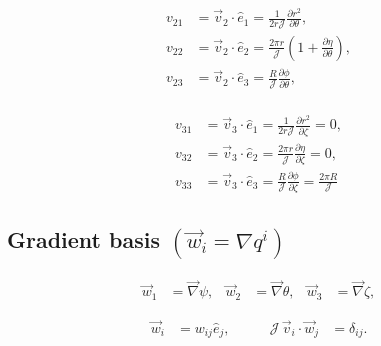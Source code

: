 \documentclass[10pt,a4paper]{article}
\numberwithin{equation}{section}
\begin{document}
\begin{equation}
\begin{aligned}
v_{21} &= \vec{v}_2 \cdot \hat{e}_1 = \frac{1}{2r\mathcal{J}}\frac{\partial r^2}{\partial \theta}, \\[6pt]
v_{22} &= \vec{v}_2 \cdot \hat{e}_2 = \frac{2\pi r}{\mathcal{J}}\left(1+\frac{\partial \eta}{\partial \theta}\right), \\[6pt]
v_{23} &= \vec{v}_2 \cdot \hat{e}_3 = \frac{R}{\mathcal{J}}\frac{\partial \phi}{\partial \theta}, \\[6pt]
\end{aligned}
\end{equation}

\begin{equation}
\begin{aligned}
v_{31} &= \vec{v}_3 \cdot \hat{e}_1 = \frac{1}{2r\mathcal{J}}\frac{\partial r^2}{\partial \zeta} = 0, \\[6pt]
v_{32} &= \vec{v}_3 \cdot \hat{e}_2 = \frac{2\pi r}{\mathcal{J}}\frac{\partial \eta}{\partial \zeta} = 0, \\[6pt]
v_{33} &= \vec{v}_3 \cdot \hat{e}_3 = \frac{R}{\mathcal{J}}\frac{\partial \phi}{\partial \zeta} = \frac{2\pi R}{\mathcal{J}}
\end{aligned}
\end{equation}


\subsection{Gradient basis $(\vec w_i=\nabla q^i)$}
\begin{equation}
\begin{aligned}
\vec{w}_1 &= \vec{\nabla}\psi, &
\vec{w}_2 &= \vec{\nabla}\theta, &
\vec{w}_3 &= \vec{\nabla}\zeta, 
\end{aligned}
\end{equation}

\begin{equation}
    \begin{aligned}
    \vec{w}_i &= w_{ij}\hat{e}_j, \qquad &
    \mathcal{J}\,\vec{v}_i \cdot \vec{w}_j &= \delta_{ij}.
    \end{aligned}
\end{equation}
\end{document}
